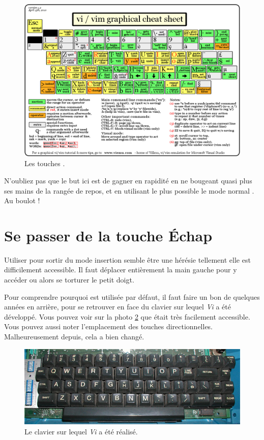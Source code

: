 \begin{figure}%
  \includegraphics[width=\linewidth]{graphics/vi-vim-cheat-sheet.png}
  \caption{Les touches \vim.}
  \label{fig:vim-cheat-sheet}
\end{figure}

N'oubliez pas que le but ici est de gagner en rapidité en ne bougeant quasi plus ses mains de la rangée de repos, et en utilisant le plus possible le \og mode normal \fg. Au boulot !

\section{Se passer de la touche Échap}\label{sec:esc}

Utiliser \ttesc pour sortir du mode \og insertion \fg{} semble être une hérésie tellement elle est difficilement accessible. Il faut déplacer entièrement la main gauche pour y accéder ou alors se torturer le petit doigt.

Pour comprendre pourquoi \ttesc est utilisée par défaut, il faut faire un bon de quelques années en arrière, pour se retrouver en face du clavier sur lequel \emph{Vi} a été développé. Vous pouvez voir sur la photo \ref{fig:vim-keyboard} que \ttesc était très facilement accessible. Vous pouvez aussi noter l'emplacement des touches directionnelles. Malheureusement depuis, cela a bien changé.

\begin{figure}%
  \includegraphics[width=\linewidth]{graphics/lsi-adm3a-full-keyboard.jpg}
  \caption{Le clavier sur lequel \emph{Vi} a été réalisé.}
  \label{fig:vim-keyboard}
\end{figure}

